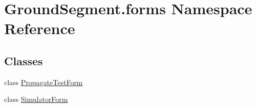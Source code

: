 \hypertarget{namespace_ground_segment_1_1forms}{}\section{Ground\+Segment.\+forms Namespace Reference}
\label{namespace_ground_segment_1_1forms}
\subsection*{Classes}
\begin{DoxyCompactItemize}
\item 
class \hyperlink{class_ground_segment_1_1forms_1_1_propagate_test_form}{Propagate\+Test\+Form}
\item 
class \hyperlink{class_ground_segment_1_1forms_1_1_simulator_form}{Simulator\+Form}
\end{DoxyCompactItemize}
